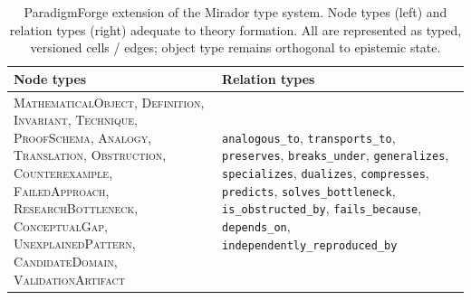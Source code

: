 \documentclass[11pt]{article}
\theoremstyle{definition}
\theoremstyle{remark}
\newcommand{\rel}[1]{\texttt{#1}}
\newcommand{\ntype}[1]{\textsc{#1}}
\newcommand{\PF}{ParadigmForge}
\begin{document}
\begin{table}[t]
\centering
\small
\caption{\PF{} extension of the Mirador type system. Node types (left) and relation types (right)
adequate to theory formation. All are represented as typed, versioned cells / edges; object type
remains orthogonal to epistemic state.}
\label{tab:nodes}
\begin{tabular}{p{} p{}}
\toprule
\textbf{Node types} & \textbf{Relation types} \\
\midrule
\ntype{MathematicalObject}, \ntype{Definition}, \ntype{Invariant}, \ntype{Technique},
\ntype{ProofSchema}, \ntype{Analogy}, \ntype{Translation}, \ntype{Obstruction},
\ntype{Counterexample}, \ntype{FailedApproach}, \ntype{ResearchBottleneck}, \ntype{ConceptualGap},
\ntype{UnexplainedPattern}, \ntype{CandidateDomain}, \ntype{ValidationArtifact}
&
\rel{analogous\_to}, \rel{transports\_to}, \rel{preserves}, \rel{breaks\_under},
\rel{generalizes}, \rel{specializes}, \rel{dualizes}, \rel{compresses}, \rel{predicts},
\rel{solves\_bottleneck}, \rel{is\_obstructed\_by}, \rel{fails\_because}, \rel{depends\_on},
\rel{independently\_reproduced\_by} \\
\bottomrule
\end{tabular}
\end{table}
\end{document}
